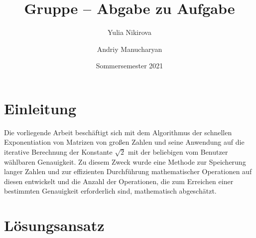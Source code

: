 \documentclass[course=erap]{aspdoc}
\author{Yulia Nikirova \and Andriy Manucharyan}
\date{Sommersemester 2021} %
\title{Gruppe \theGroup{} -- Abgabe zu Aufgabe \theNumber}
\begin{document}
\maketitle

\section{Einleitung}
Die vorliegende Arbeit beschäftigt sich mit dem Algorithmus der schnellen Exponentiation von Matrizen von großen Zahlen und seine Anwendung auf die iterative Berechnung der Konstante  \(\sqrt{2}\) mit der beliebigen vom Benutzer wählbaren Genauigkeit. Zu diesem Zweck wurde eine Methode zur Speicherung langer Zahlen und zur effizienten Durchführung mathematischer Operationen auf diesen entwickelt und die Anzahl der Operationen, die zum Erreichen einer bestimmten Genauigkeit erforderlich sind, mathematisch abgeschätzt.
\section{Lösungsansatz}
\end{document}
